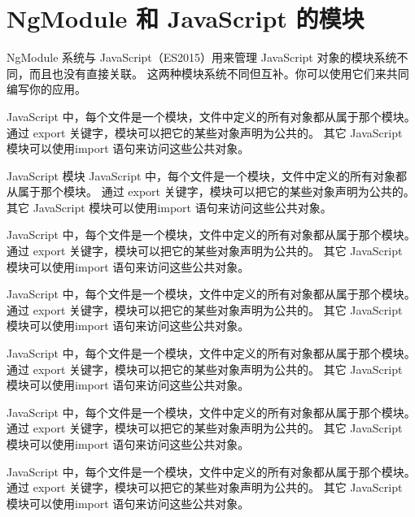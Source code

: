 \documentclass{progbookcn}
\begin{document}
\clearpage

\section{NgModule 和 JavaScript 的模块}

NgModule 系统与 JavaScript（ES2015）用来管理 JavaScript 对象的模块系统不同，而且也没有直接关联。 这两种模块系统不同但互补。你可以使用它们来共同编写你的应用。

JavaScript 中，每个文件是一个模块，文件中定义的所有对象都从属于那个模块。 通过 export 关键字，模块可以把它的某些对象声明为公共的。 其它 JavaScript 模块可以使用import 语句来访问这些公共对象。


\begin{titledbox}{JavaScript 模块}
  JavaScript 中，每个文件是一个模块，文件中定义的所有对象都从属于那个模块。 通过 export 关键字，模块可以把它的某些对象声明为公共的。 其它 JavaScript 模块可以使用import 语句来访问这些公共对象。
  
  JavaScript 中，每个文件是一个模块，文件中定义的所有对象都从属于那个模块。 通过 export 关键字，模块可以把它的某些对象声明为公共的。 其它 JavaScript 模块可以使用import 语句来访问这些公共对象。
\end{titledbox}

\begin{information}
  JavaScript 中，每个文件是一个模块，文件中定义的所有对象都从属于那个模块。 通过 export 关键字，模块可以把它的某些对象声明为公共的。 其它 JavaScript 模块可以使用import 语句来访问这些公共对象。
  
  JavaScript 中，每个文件是一个模块，文件中定义的所有对象都从属于那个模块。 通过 export 关键字，模块可以把它的某些对象声明为公共的。 其它 JavaScript 模块可以使用import 语句来访问这些公共对象。
\end{information}


\begin{question}
  JavaScript 中，每个文件是一个模块，文件中定义的所有对象都从属于那个模块。 通过 export 关键字，模块可以把它的某些对象声明为公共的。 其它 JavaScript 模块可以使用import 语句来访问这些公共对象。
\end{question}

\begin{keypoint}
  JavaScript 中，每个文件是一个模块，文件中定义的所有对象都从属于那个模块。 通过 export 关键字，模块可以把它的某些对象声明为公共的。 其它 JavaScript 模块可以使用import 语句来访问这些公共对象。
\end{keypoint}
\end{document}
